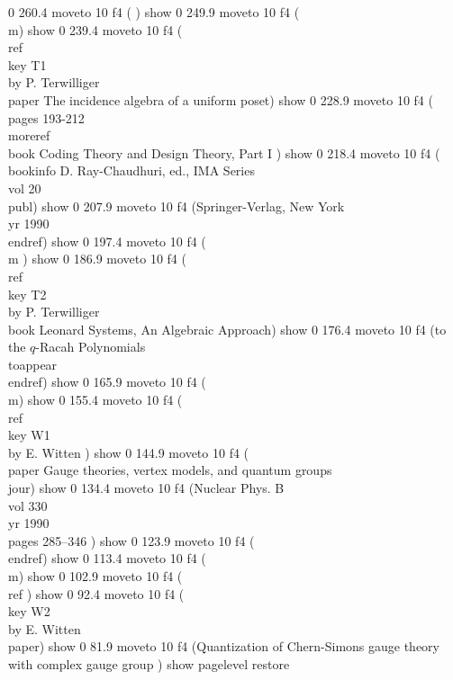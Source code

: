 0 260.4 moveto
10 f4
( ) show
0 249.9 moveto
10 f4
(\\m) show
0 239.4 moveto
10 f4
(\\ref\\key T1 \\by P. Terwilliger \\paper The incidence algebra of a uniform poset) show
0 228.9 moveto
10 f4
(\\pages 193-212   \\moreref \\book Coding Theory and Design Theory, Part I ) show
0 218.4 moveto
10 f4
(\\bookinfo D. Ray-Chaudhuri, ed., IMA Series \\vol 20 \\publ) show
0 207.9 moveto
10 f4
(Springer-Verlag, New York \\yr 1990 \\endref) show
0 197.4 moveto
10 f4
(\\m ) show
0 186.9 moveto
10 f4
(\\ref\\key T2 \\by P. Terwilliger \\book Leonard Systems,  An Algebraic Approach) show
0 176.4 moveto
10 f4
(to the $q$-Racah Polynomials  \\toappear \\endref) show
0 165.9 moveto
10 f4
(\\m) show
0 155.4 moveto
10 f4
(\\ref \\key W1 \\by E. Witten ) show
0 144.9 moveto
10 f4
(\\paper Gauge theories, vertex models, and quantum groups \\jour) show
0 134.4 moveto
10 f4
(Nuclear Phys. B \\vol 330 \\yr 1990  \\pages  285--346 ) show
0 123.9 moveto
10 f4
(\\endref) show
0 113.4 moveto
10 f4
(\\m) show
0 102.9 moveto
10 f4
(\\ref ) show
0 92.4 moveto
10 f4
(\\key W2 \\by E. Witten \\paper) show
0 81.9 moveto
10 f4
(Quantization of Chern-Simons gauge theory with complex gauge group ) show
pagelevel restore

